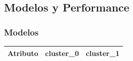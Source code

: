 \documentclass[osajnl,twocolumn,showpacs,superscriptaddress,10pt,floatfix]{revtex4-1} %
\begin{document}
\onecolumngrid

\clearpage

\subsection{Modelos y Performance}

\subsubsection{Modelos} \label{apendix:models:models}

\begin{table}[ht]
    \begin{tabular}{|l|l|l|}
        \hline
        Atributo & cluster\_0 & cluster\_1 \\
        \hline


\end{tabular}
\end{table}
\end{document}
